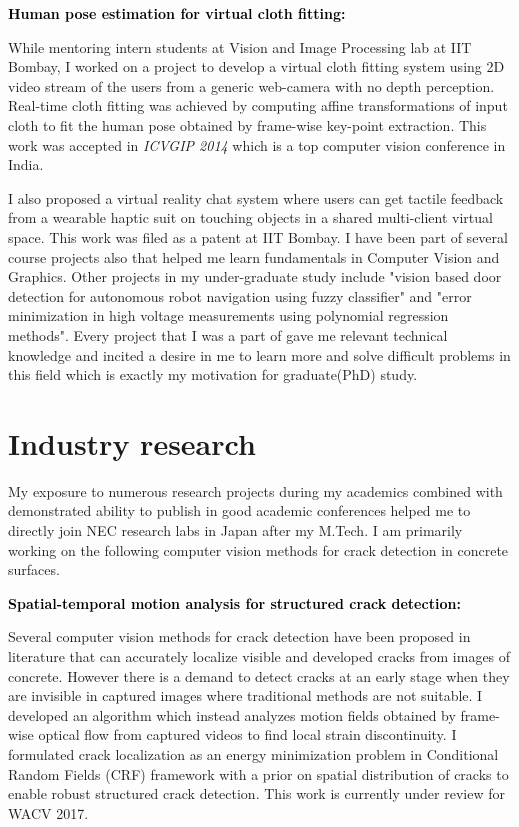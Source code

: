 \documentclass{article}
\newcommand{\statement}[1]{\par\medskip
	{\textcolor{black}{\textbf{#1:}}}\space
}
\begin{document}
	\statement{Human pose estimation for virtual cloth fitting}
	 While mentoring intern students at Vision and Image Processing lab at IIT Bombay, I worked on a project to develop a  virtual cloth fitting system using 2D video stream of the users from a generic web-camera with no depth perception. Real-time cloth fitting was achieved by computing affine transformations of input cloth to fit the human pose obtained by frame-wise key-point extraction. This work was accepted in \textit{ICVGIP 2014} which is a top computer vision conference in India.
	
	\vspace{0.1cm}
	 I also proposed a virtual reality chat system where users can get tactile feedback from a wearable haptic suit on touching objects in a shared multi-client virtual space. This work was filed as a patent at IIT Bombay. I have been part of several course projects also that helped me learn fundamentals in Computer Vision and Graphics. Other projects in my under-graduate study include "vision based door detection for autonomous robot navigation using fuzzy classifier" and "error minimization in high voltage measurements using polynomial regression methods". Every project that I was a part of gave me relevant technical knowledge and incited a desire in me to learn more and solve difficult problems in this field which is exactly my motivation for graduate(PhD) study.

	\vspace*{-0.25cm}
	\section{Industry research}
	\vspace*{-0.25cm}
	My exposure to numerous research projects during my academics combined with demonstrated ability to publish in good academic conferences helped me to directly join NEC research labs in Japan after my M.Tech. I am primarily working on the following computer vision methods for crack detection in concrete surfaces.
	
	\statement{Spatial-temporal motion analysis for structured crack detection}
	Several computer vision methods for crack detection have been proposed in literature that can accurately localize visible and developed cracks from images of concrete. However there is a demand to detect cracks at an early stage when they are invisible in captured images where traditional methods are not suitable. I developed an algorithm which instead analyzes motion fields obtained by frame-wise optical flow from captured videos to find local strain discontinuity. I formulated crack localization as an energy minimization problem in Conditional Random Fields (CRF) framework with a prior on spatial distribution of cracks to enable robust structured crack detection. This work is currently under review for WACV 2017. 
	
\end{document}
